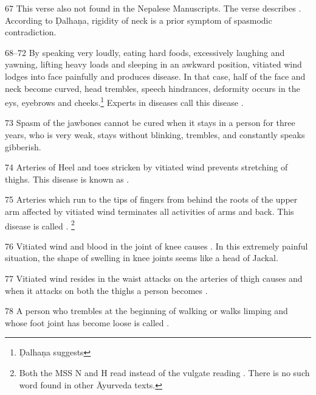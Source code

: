 \begin{translation}
{\item[67] This verse also not found in the Nepalese Manuscripts. The verse 
describes . According to Ḍalhaṇa, rigidity 
of neck is a prior symptom of spasmodic contradiction. 

\item[68--72] By speaking very loudly, eating hard foods, excessively laughing 
and yawning, lifting heavy loads and sleeping in an awkward position, vitiated 
wind lodges into face painfully and produces  disease. In that case, half of the face and neck become curved, head 
trembles, speech hindrances, deformity occurs in the eys, eyebrows and 
cheeks.\footnote{Ḍalhaṇa suggests } Experts in diseases call this disease . 

\item[73] Spasm of the jawbones cannot be cured when it stays in a person for three years, who is very weak, stays without blinking, trembles, and constantly speaks gibberish.

\item[74] Arteries of Heel and toes stricken by vitiated wind prevents stretching 
of thighs. This disease is known as .

\item[75] Arteries which run to the tips of fingers from behind the roots of the 
upper arm affected by vitiated wind terminates all activities of arms and back. 
This disease is called . \footnote{Both 
the MSS N and H read  instead of the vulgate reading 
. There is no such word found in other Āyurveda texts.}

\item[76] Vitiated wind and blood in the joint of knee causes 
. In this extremely painful situation, the 
shape of swelling in knee joints seems like a head of Jackal. 

\item[77] Vitiated wind resides in the waist attacks on the arteries of thigh 
causes  and when it attacks on both the thighs a person 
becomes .

\item[78] A person who trembles at the beginning of walking or walks limping 
and whose foot joint has become loose is called .

}
\end{translation}
